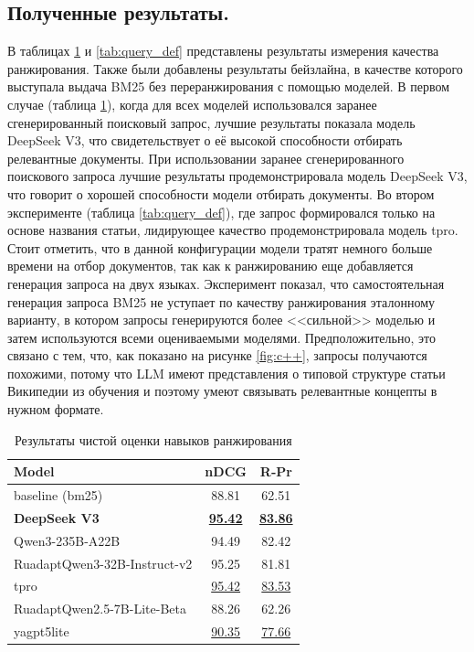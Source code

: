 \documentclass{article}
\begin{document}
\subsection*{Полученные результаты.}
В таблицах \ref{tab:query_ref} и \ref{tab:query_def} представлены результаты измерения качества ранжирования. 
Также были добавлены результаты бейзлайна, в качестве которого выступала выдача BM25 без переранжирования с помощью моделей. 
В первом случае (таблица \ref{tab:query_ref}), когда для всех моделей использовался заранее сгенерированный поисковый запрос, 
лучшие результаты показала модель DeepSeek V3, что свидетельствует о её высокой способности отбирать релевантные документы.
При использовании заранее сгенерированного поискового запроса лучшие результаты продемонстрировала модель DeepSeek V3, что говорит о хорошей способности модели отбирать документы.
Во втором эксперименте (таблица \ref{tab:query_def}), где запрос формировался только на основе названия статьи, лидирующее качество продемонстрировала модель tpro. 
Стоит отметить, что в данной конфигурации модели тратят немного больше времени на отбор документов, так как к ранжированию еще добавляется генерация запроса на двух языках.
Эксперимент показал, что самостоятельная генерация запроса BM25 не уступает по качеству ранжирования эталонному варианту, в котором запросы генерируются более <<сильной>> моделью и затем
используются всеми оцениваемыми моделями. Предположительно, это связано с тем, что, как показано на рисунке \ref{fig:c++}, запросы получаются похожими, потому что
LLM имеют представления о типовой структуре статьи Википедии из обучения и поэтому умеют связывать релевантные концепты в нужном формате.

\begin{table}[ht!]
\centering
\caption{Результаты чистой оценки навыков ранжирования}
\begin{tabular}{l|c|c}
\hline
\textbf{Model} & \textbf{nDCG} & \textbf{R‑Pr} \\
\hline
baseline (bm25)                                     & 88.81 & 62.51 \\
\hline
\textbf{DeepSeek V3}                                & \uline{\textbf{95.42}} & \uline{\textbf{83.86}} \\
Qwen3-235B-A22B                                     & 94.49 & 82.42 \\
\hline
RuadaptQwen3-32B-Instruct-v2                        & 95.25 & 81.81 \\
tpro                                                & \uline{95.42} & \uline{83.53} \\
\hline
RuadaptQwen2.5-7B-\allowbreak Lite-\allowbreak Beta & 88.26 & 62.26 \\
yagpt5lite                                          & \uline{90.35} & \uline{77.66} \\
\hline
\end{tabular}
\label{tab:query_ref}
\end{table}
\end{document}

